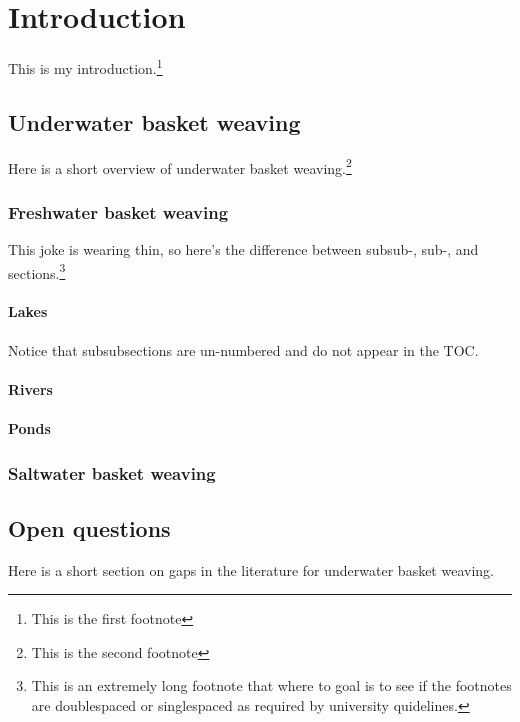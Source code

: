 \chapter{Introduction}

This is my introduction.\footnote{This is the first footnote}

\section{Underwater basket weaving}

Here is a short overview of underwater basket weaving.\footnote{This is the second footnote}

\subsection{Freshwater basket weaving}

This joke is wearing thin, so here's the difference between subsub-, sub-, and sections.\footnote{This is an extremely long footnote that where to goal is to see if the footnotes are doublespaced or singlespaced as required by university quidelines.}

\subsubsection{Lakes}
Notice that subsubsections are un-numbered and do not appear in the TOC.
\subsubsection{Rivers}
\subsubsection{Ponds}

\subsection{Saltwater basket weaving}

\section{Open questions}

Here is a short section on gaps in the literature for underwater basket weaving.
